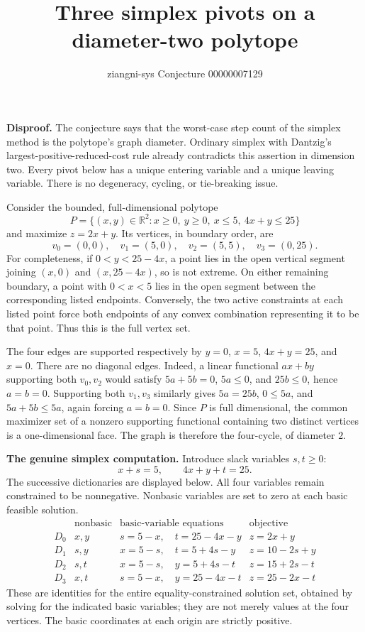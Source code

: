 \documentclass[11pt]{article}
\title{Three simplex pivots on a diameter-two polytope}
\author{ziangni-sys \quad Conjecture 00000007129}
\date{}
\begin{document}
\maketitle
\vspace{-2em}
\textbf{Disproof.} The conjecture says that the worst-case step count of the simplex method is the polytope's graph diameter. Ordinary simplex with Dantzig's largest-positive-reduced-cost rule already contradicts this assertion in dimension two. Every pivot below has a unique entering variable and a unique leaving variable. There is no degeneracy, cycling, or tie-breaking issue.

Consider the bounded, full-dimensional polytope
\[
 P=\{(x,y)\in\mathbb R^2: x\ge0,\ y\ge0,\ x\le5,\ 4x+y\le25\}
\]
and maximize $z=2x+y$. Its vertices, in boundary order, are
\[
 v_0=(0,0),\quad v_1=(5,0),\quad v_2=(5,5),\quad v_3=(0,25).
\]
For completeness, if $0<y<25-4x$, a point lies in the open vertical segment joining $(x,0)$ and $(x,25-4x)$, so is not extreme. On either remaining boundary, a point with $0<x<5$ lies in the open segment between the corresponding listed endpoints. Conversely, the two active constraints at each listed point force both endpoints of any convex combination representing it to be that point. Thus this is the full vertex set.

The four edges are supported respectively by $y=0$, $x=5$, $4x+y=25$, and $x=0$. There are no diagonal edges. Indeed, a linear functional $ax+by$ supporting both $v_0,v_2$ would satisfy $5a+5b=0$, $5a\le0$, and $25b\le0$, hence $a=b=0$. Supporting both $v_1,v_3$ similarly gives $5a=25b$, $0\le5a$, and $5a+5b\le5a$, again forcing $a=b=0$. Since $P$ is full dimensional, the common maximizer set of a nonzero supporting functional containing two distinct vertices is a one-dimensional face. The graph is therefore the four-cycle, of diameter $2$.

\textbf{The genuine simplex computation.} Introduce slack variables $s,t\ge0$:
\[
 x+s=5,\qquad 4x+y+t=25.
\]
The successive dictionaries are displayed below. All four variables remain constrained to be nonnegative. Nonbasic variables are set to zero at each basic feasible solution.
\[
\begin{array}{c|c|l|l}
 &\text{nonbasic}&\text{basic-variable equations}&\text{objective}\\\hline
D_0&x,y&s=5-x,\quad t=25-4x-y&z=2x+y\\
D_1&s,y&x=5-s,\quad t=5+4s-y&z=10-2s+y\\
D_2&s,t&x=5-s,\quad y=5+4s-t&z=15+2s-t\\
D_3&x,t&s=5-x,\quad y=25-4x-t&z=25-2x-t
\end{array}
\]
These are identities for the entire equality-constrained solution set, obtained by solving for the indicated basic variables; they are not merely values at the four vertices. The basic coordinates at each origin are strictly positive.
\end{document}
